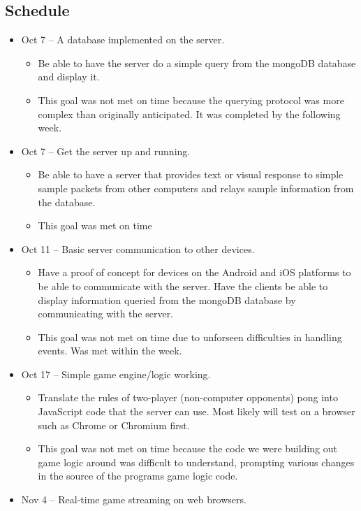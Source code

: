 \documentclass[letterpaper,12pt]{article}
\begin{document}
\subsection{Schedule}
\begin{itemize}
	\item Oct 7 -- A database implemented on the server.
	\begin{itemize}
		\item  Be able to have the server do a simple query from the mongoDB database and display it.
		\item This goal was not met on time because the querying protocol was more complex than originally anticipated. It was completed by the following week.
	\end{itemize}
	\item Oct 7 -- Get the server up and running. 
	\begin{itemize}
		\item Be able to have a server that provides text or visual response to simple sample packets from other computers and relays sample information from the database.
		\item This goal was met on time
	\end{itemize}
	\item Oct 11 -- Basic server communication to other devices. 
	\begin{itemize}
		\item Have a proof of concept for devices on the Android and iOS platforms to be able to communicate with the server. Have the clients be able to display information queried from the mongoDB database by communicating with the server.
		\item This goal was not met on time due to unforseen difficulties in handling events. Was met within the week.
	\end{itemize}
	\item Oct 17 -- Simple game engine/logic working.
	\begin{itemize}
		\item Translate the rules of two-player (non-computer opponents) pong into JavaScript code that the server can use. Most likely will test on a browser such as Chrome or Chromium first.
		\item This goal was not met on time because the code we were building out game logic around was difficult to understand, prompting various changes in the source of the programs game logic code.
	\end{itemize}
	\item Nov 4 -- Real-time game streaming on web browsers.

\end{itemize}
\end{document}

